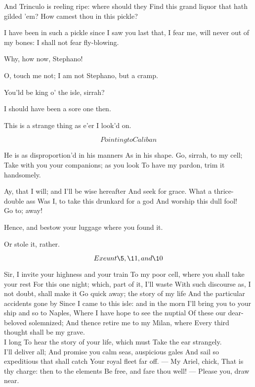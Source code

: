 \documentclass[11pt]{book}
\begin{document}
\6	And Trinculo is reeling ripe: where should they
	Find this grand liquor that hath gilded 'em?
	How camest thou in this pickle?

\begin{PROSE}

	I have been in such a pickle since I
	saw you last that, I fear me, will never out of
	my bones: I shall not fear fly-blowing.

\8	Why, how now, Stephano!

  O, touch me not; I am not Stephano, but a cramp.
\end{PROSE}

\1	You'ld be king o' the isle, sirrah?

	I should have been a sore one then.

\6	This is a strange thing as e'er I look'd on.

	\[Pointing to Caliban\]

\1	He is as disproportion'd in his manners
	As in his shape. Go, sirrah, to my cell;
	Take with you your companions; as you look
	To have my pardon, trim it handsomely.

\5	Ay, that I will; and I'll be wise hereafter
	And seek for grace. What a thrice-double ass
	Was I, to take this drunkard for a god
	And worship this dull fool! \\

\1	Go to; away!

\6	Hence, and bestow your luggage where you found it.

\8	Or stole it, rather.

	\[Exeunt \5, \11, and \10\]

\1	Sir, I invite your highness and your train
	To my poor cell, where you shall take your rest
	For this one night; which, part of it, I'll waste
	With such discourse as, I not doubt, shall make it
	Go quick away; the story of my life
	And the particular accidents gone by
	Since I came to this isle: and in the morn
	I'll bring you to your ship and so to Naples,
	Where I have hope to see the nuptial
	Of these our dear-beloved solemnized;
	And thence retire me to my Milan, where
	Every third thought shall be my grave. \\

\6	I long
	To hear the story of your life, which must
	Take the ear strangely. \\

\1	I'll deliver all;
	And promise you calm seas, auspicious gales
	And sail so expeditious that shall catch
	Your royal fleet far off. --- My Ariel, chick,
	That is thy charge: then to the elements
	Be free, and fare thou well! --- Please you, draw near.
\end{document}

